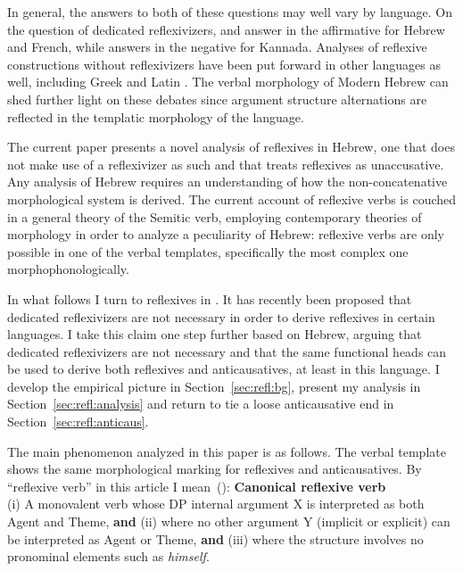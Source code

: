 In general, the answers to both of these questions may well vary by language. On the question of dedicated reflexivizers, \cite{reinhartsiloni05} and \cite{labelle08} answer in the affirmative for Hebrew and French, while \cite{lidz01} answers in the negative for Kannada. Analyses of reflexive constructions without reflexivizers have been put forward in other languages as well, including Greek \citep{spathasetal15} and Latin \citep{miller10latin}. The verbal morphology of Modern Hebrew can shed further light on these debates since argument structure alternations are reflected in the templatic morphology of the language.

The current paper presents a novel analysis of reflexives in Hebrew, one that does not make use of a reflexivizer as such and that treats reflexives as unaccusative. Any analysis of Hebrew requires an understanding of how the non-concatenative morphological system is derived. The current account of reflexive verbs is couched in a general theory of the Semitic verb, employing contemporary theories of morphology in order to analyze a peculiarity of Hebrew: reflexive verbs are only possible in one of the verbal templates, specifically the most complex one morphophonologically.




In what follows I turn to reflexives in \thit. It has recently been proposed that dedicated reflexivizers are not necessary in order to derive reflexives in certain languages. I take this claim one step further based on Hebrew, arguing that dedicated reflexivizers are not necessary and that the same functional heads can be used to derive both reflexives and anticausatives, at least in this language. I develop the empirical picture in Section~\ref{sec:refl:bg}, present my analysis in Section~\ref{sec:refl:analysis} and return to tie a loose anticausative end in Section~\ref{sec:refl:anticaus}.


The main phenomenon analyzed in this paper is as follows. The verbal template {\thit} shows the same morphological marking for reflexives and anticausatives. By ``reflexive verb'' in this article I mean~(\nextx):
\ex \textbf{Canonical reflexive verb}\\
	(i) A monovalent verb whose DP internal argument X is interpreted as both Agent and Theme, \textbf{and} (ii) where no other argument Y (implicit or explicit) can be interpreted as Agent or Theme, \textbf{and} (iii) where the structure involves no pronominal elements such as \emph{himself}.
\xe

